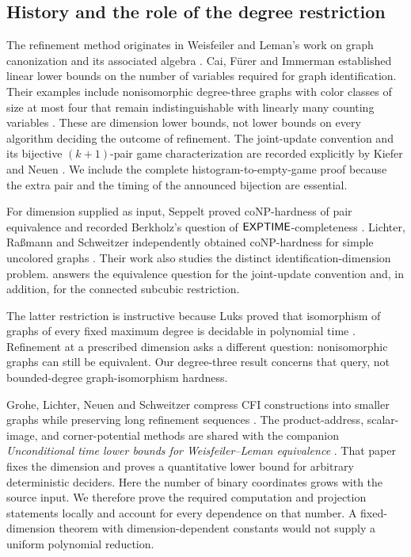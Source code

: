 \subsection{History and the role of the degree restriction}

The refinement method originates in Weisfeiler and Leman's work on
graph canonization and its associated algebra \citep{WeisfeilerLeman1968}.
Cai, F{\"u}rer and Immerman established linear lower bounds on the
number of variables required for graph identification. Their examples
include nonisomorphic degree-three graphs with color classes of size at most
four that remain indistinguishable with linearly many counting variables
\citep[Theorem~5.2 and Corollary~6.5]{CaiFurerImmerman1992}.
These are dimension lower bounds, not lower bounds on every algorithm
deciding the outcome of refinement. The joint-update convention and its
bijective \((k+1)\)-pair game characterization are recorded explicitly by
Kiefer and Neuen \citep[Section~2.2 and Theorem~1]{KieferNeuen2019}.
We include the complete histogram-to-empty-game proof because the
extra pair and the timing of the announced bijection are essential.

For dimension supplied as input, Seppelt proved coNP-hardness of
pair equivalence and recorded Berkholz's question of
\(\mathsf{EXPTIME}\)-completeness
\citep[Theorem~5 and the preceding question, p.~82:3]{Seppelt2024}.
Lichter, Ra{\ss}mann and Schweitzer independently obtained coNP-hardness
for simple uncolored graphs
\citep[Theorem~19]{LichterRassmannSchweitzer2025}.
Their work also studies the distinct identification-dimension problem.
 answers the equivalence question for the joint-update
convention and, in addition, for the connected subcubic restriction.

The latter restriction is instructive because Luks proved that
isomorphism of graphs of every fixed maximum degree is decidable in
polynomial time \citep{Luks1982}. Refinement at a prescribed dimension
asks a different question: nonisomorphic graphs can still be equivalent.
Our degree-three result concerns that query, not bounded-degree
graph-isomorphism hardness.

Grohe, Lichter, Neuen and Schweitzer compress CFI constructions into
smaller graphs while preserving long refinement sequences
\citep{cfiCompression2025}. The product-address,
scalar-image, and corner-potential methods are shared with the companion
\emph{Unconditional time lower bounds for Weisfeiler--Leman equivalence}
\citep[Sections~3--4]{CompanionFixedDimension}. That paper fixes the
dimension and proves a quantitative lower bound for arbitrary
deterministic deciders. Here the number of binary coordinates grows with
the source input. We therefore prove the required computation and
projection statements locally and account for every dependence on that
number. A fixed-dimension theorem with dimension-dependent constants
would not supply a uniform polynomial reduction.

